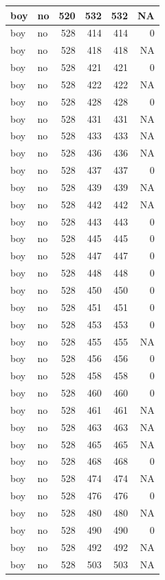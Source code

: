 \documentclass[man]{apa6}
\begin{document}
\begin{tabular}{l|l|r|r|r|r}
\hline
boy & no & 520 & 532 & 532 & NA\\
\hline
boy & no & 528 & 414 & 414 & 0\\
\hline
boy & no & 528 & 418 & 418 & NA\\
\hline
boy & no & 528 & 421 & 421 & 0\\
\hline
boy & no & 528 & 422 & 422 & NA\\
\hline
boy & no & 528 & 428 & 428 & 0\\
\hline
boy & no & 528 & 431 & 431 & NA\\
\hline
boy & no & 528 & 433 & 433 & NA\\
\hline
boy & no & 528 & 436 & 436 & NA\\
\hline
boy & no & 528 & 437 & 437 & 0\\
\hline
boy & no & 528 & 439 & 439 & NA\\
\hline
boy & no & 528 & 442 & 442 & NA\\
\hline
boy & no & 528 & 443 & 443 & 0\\
\hline
boy & no & 528 & 445 & 445 & 0\\
\hline
boy & no & 528 & 447 & 447 & 0\\
\hline
boy & no & 528 & 448 & 448 & 0\\
\hline
boy & no & 528 & 450 & 450 & 0\\
\hline
boy & no & 528 & 451 & 451 & 0\\
\hline
boy & no & 528 & 453 & 453 & 0\\
\hline
boy & no & 528 & 455 & 455 & NA\\
\hline
boy & no & 528 & 456 & 456 & 0\\
\hline
boy & no & 528 & 458 & 458 & 0\\
\hline
boy & no & 528 & 460 & 460 & 0\\
\hline
boy & no & 528 & 461 & 461 & NA\\
\hline
boy & no & 528 & 463 & 463 & NA\\
\hline
boy & no & 528 & 465 & 465 & NA\\
\hline
boy & no & 528 & 468 & 468 & 0\\
\hline
boy & no & 528 & 474 & 474 & NA\\
\hline
boy & no & 528 & 476 & 476 & 0\\
\hline
boy & no & 528 & 480 & 480 & NA\\
\hline
boy & no & 528 & 490 & 490 & 0\\
\hline
boy & no & 528 & 492 & 492 & NA\\
\hline
boy & no & 528 & 503 & 503 & NA\\

\end{tabular}
\end{document}
